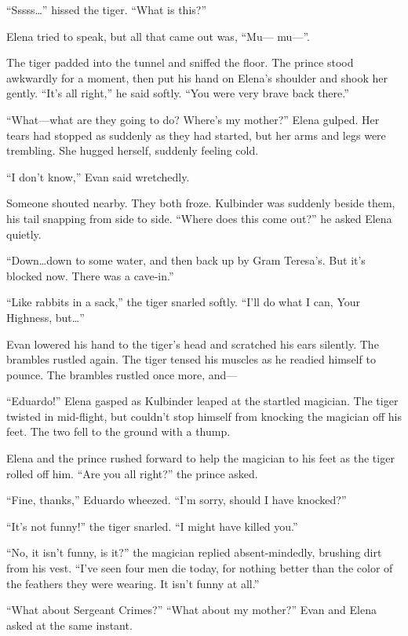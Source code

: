 \documentclass[10pt]{book}
\begin{document}
``Sssss{\ldots}'' hissed the tiger. ``What is this?''

Elena tried to speak, but all that came out was, ``Mu--- mu---''.

The tiger padded into the tunnel and sniffed the floor. The prince stood awkwardly for a moment, then put his hand on Elena's shoulder and shook her gently. ``It's all right,'' he said softly. ``You were very brave back there.''

``What---what are they going to do? Where's my mother?'' Elena gulped. Her tears had stopped as suddenly as they had started, but her arms and legs were trembling. She hugged herself, suddenly feeling cold.

``I don't know,'' Evan said wretchedly.

Someone shouted nearby. They both froze. Kulbinder was suddenly beside them, his tail snapping from side to side. ``Where does this come out?'' he asked Elena quietly.

``Down{\ldots}down to some water, and then back up by Gram Teresa's. But it's blocked now. There was a cave-in.''

``Like rabbits in a sack,'' the tiger snarled softly. ``I'll do what I can, Your Highness, but{\ldots}''

Evan lowered his hand to the tiger's head and scratched his ears silently. The brambles rustled again. The tiger tensed his muscles as he readied himself to pounce. The brambles rustled once more, and---

``Eduardo!'' Elena gasped as Kulbinder leaped at the startled magician. The tiger twisted in mid-flight, but couldn't stop himself from knocking the magician off his feet. The two fell to the ground with a thump.

Elena and the prince rushed forward to help the magician to his feet as the tiger rolled off him. ``Are you all right?'' the prince asked.

``Fine, thanks,'' Eduardo wheezed. ``I'm sorry, should I have knocked?''

``It's not funny!'' the tiger snarled. ``I might have killed you.''

``No, it isn't funny, is it?'' the magician replied absent-mindedly, brushing dirt from his vest. ``I've seen four men die today, for nothing better than the color of the feathers they were wearing. It isn't funny at all.''

``What about Sergeant Crimes?'' ``What about my mother?'' Evan and Elena asked at the same instant.
\end{document}
